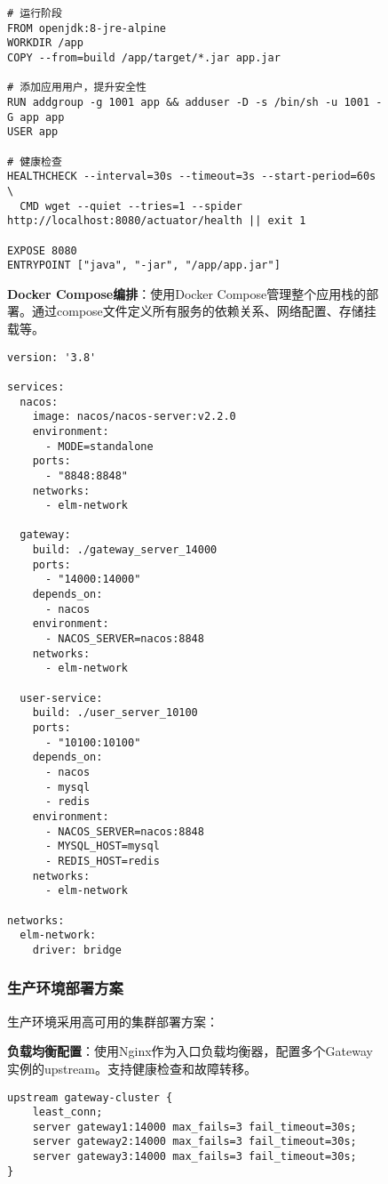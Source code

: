\documentclass[a4paper,12pt]{article}
\begin{document}
\begin{figure}[H]
\begin{lstlisting}[caption=Dockerfile示例]
# 运行阶段
FROM openjdk:8-jre-alpine
WORKDIR /app
COPY --from=build /app/target/*.jar app.jar

# 添加应用用户，提升安全性
RUN addgroup -g 1001 app && adduser -D -s /bin/sh -u 1001 -G app app
USER app

# 健康检查
HEALTHCHECK --interval=30s --timeout=3s --start-period=60s \
  CMD wget --quiet --tries=1 --spider http://localhost:8080/actuator/health || exit 1

EXPOSE 8080
ENTRYPOINT ["java", "-jar", "/app/app.jar"]
\end{lstlisting}

\textbf{Docker Compose编排}：使用Docker Compose管理整个应用栈的部署。通过compose文件定义所有服务的依赖关系、网络配置、存储挂载等。

\begin{lstlisting}[caption=docker-compose.yml部分配置]
version: '3.8'

services:
  nacos:
    image: nacos/nacos-server:v2.2.0
    environment:
      - MODE=standalone
    ports:
      - "8848:8848"
    networks:
      - elm-network

  gateway:
    build: ./gateway_server_14000
    ports:
      - "14000:14000"
    depends_on:
      - nacos
    environment:
      - NACOS_SERVER=nacos:8848
    networks:
      - elm-network

  user-service:
    build: ./user_server_10100
    ports:
      - "10100:10100"
    depends_on:
      - nacos
      - mysql
      - redis
    environment:
      - NACOS_SERVER=nacos:8848
      - MYSQL_HOST=mysql
      - REDIS_HOST=redis
    networks:
      - elm-network

networks:
  elm-network:
    driver: bridge
\end{lstlisting}

\subsubsection{生产环境部署方案}

生产环境采用高可用的集群部署方案：

\textbf{负载均衡配置}：使用Nginx作为入口负载均衡器，配置多个Gateway实例的upstream。支持健康检查和故障转移。

\begin{lstlisting}[caption=Nginx负载均衡配置]
upstream gateway-cluster {
    least_conn;
    server gateway1:14000 max_fails=3 fail_timeout=30s;
    server gateway2:14000 max_fails=3 fail_timeout=30s;
    server gateway3:14000 max_fails=3 fail_timeout=30s;
}


\end{lstlisting}
\end{figure}
\end{document}
